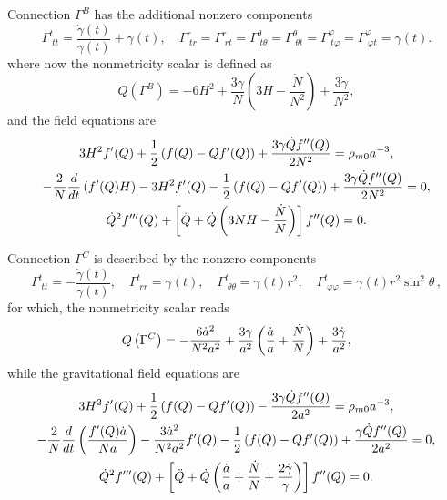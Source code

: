 \documentclass[onecolumn,superscriptaddress,secnumarabic,nobibnotes,aps,prd,nofootinbib,altaffilletter,11pt]{revtex4}
\begin{document}
Connection $\Gamma ^{B}$ has the additional nonzero components 
\begin{equation*}
\Gamma _{\;tt}^{t}=\frac{\dot{\gamma}(t)}{\gamma (t)}+\gamma (t),\quad
\Gamma _{\;tr}^{r}=\Gamma _{\;rt}^{r}=\Gamma _{\;t\theta }^{\theta }=\Gamma
_{\;\theta t}^{\theta }=\Gamma _{\;t\varphi }^{\varphi }=\Gamma _{\;\varphi
t}^{\varphi }=\gamma (t).
\end{equation*}%
where now the nonmetricity scalar is defined as \cite{he1,he2,he3}%
\begin{equation}
Q\left( \Gamma ^{B}\right) =-6H^{2}+\frac{3\gamma }{N}\left( 3H-\frac{\dot{N}%
}{N^{2}}\right) +\frac{3\dot{\gamma}}{N^{2}},
\end{equation}%
and the field equations are%
\begin{gather}
3H^{2}f^{\prime }(Q)+\frac{1}{2}\left( f(Q)-Qf^{\prime }(Q)\right) +\frac{%
3\gamma \dot{Q}f^{\prime \prime }(Q)}{2N^{2}}  = \rho _{m0}a^{-3}, \\
-\frac{2}{N}\frac{d}{dt}\left( f^{\prime }(Q)H\right) -3H^{2}f^{\prime }(Q)-%
\frac{1}{2}\left( f(Q)-Qf^{\prime }(Q)\right) +\frac{3\gamma \dot{Q}%
f^{\prime \prime }(Q)}{2N^{2}}  = 0, \\
\dot{Q}^{2}f^{\prime \prime \prime }(Q)+\left[ \ddot{Q}+\dot{Q}\left( 3NH-%
\frac{\dot{N}}{N}\right) \right] f^{\prime \prime }(Q) = 0.
\end{gather}%

Connection $\Gamma ^{C}$ is described by the nonzero components%
\begin{equation*}
\Gamma _{\;tt}^{t}=-\frac{\dot{\gamma}(t)}{\gamma (t)},\quad \Gamma
_{\;rr}^{t}=\gamma (t),\quad \Gamma _{\;\theta \theta }^{t}=\gamma
(t)r^{2},\quad \Gamma _{\;\varphi \varphi }^{t}=\gamma (t)r^{2}\sin
^{2}\theta\,,
\end{equation*}%
for which, the nonmetricity scalar reads %
\begin{equation*}
Q\left( \Gamma ^{C}\right) =-\frac{6\dot{a}^{2}}{N^{2}a^{2}}+\frac{3\gamma }{%
a^{2}}\left( \frac{\dot{a}}{a}+\frac{\dot{N}}{N}\right) +\frac{3\dot{\gamma}%
}{a^{2}},
\end{equation*}%
while the gravitational field equations are%
\begin{gather}
3H^{2}f^{\prime }(Q)+\frac{1}{2}\left( f(Q)-Qf^{\prime }(Q)\right) -\frac{%
3\gamma \dot{Q}f^{\prime \prime }(Q)}{2a^{2}}  = \rho _{m0}a^{-3}, \\
-\frac{2}{N}\frac{d}{dt}\left( \frac{f^{\prime }(Q)\dot{a}}{Na}\right) -%
\frac{3\dot{a}^{2}}{N^{2}a^{2}}f^{\prime }(Q)-\frac{1}{2}\left(
f(Q)-Qf^{\prime }(Q)\right) +\frac{\gamma \dot{Q}f^{\prime \prime }(Q)}{%
2a^{2}} = 0, \\
\dot{Q}^{2}f^{\prime \prime \prime }(Q)+\left[ \ddot{Q}+\dot{Q}\left( \frac{%
\dot{a}}{a}+\frac{\dot{N}}{N}+\frac{2\dot{\gamma}}{\gamma }\right) \right]
f^{\prime \prime }(Q)  = 0.
\end{gather}
\end{document}
